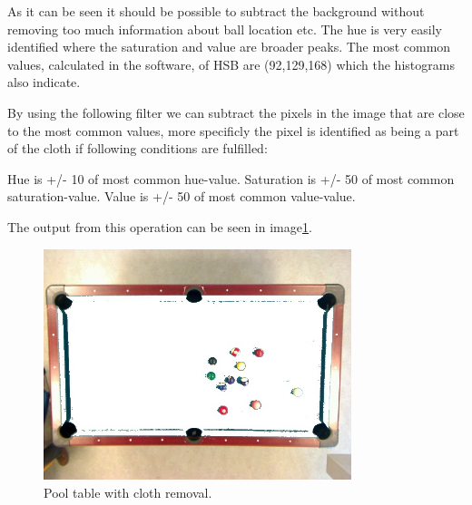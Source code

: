 As it can be seen it should be possible to subtract the background without removing too much information about ball location etc. The hue is very easily identified where the saturation and value are broader peaks.
The most common values, calculated in the software, of HSB are (92,129,168) which the histograms also indicate.

By using the following filter we can subtract the pixels in the image that are close to the most common values, more specificly the pixel is identified as being a part of the cloth if following conditions are fulfilled:

Hue is +/- 10 of most common hue-value.
Saturation is +/- 50 of most common saturation-value.
Value is +/- 50 of most common value-value.

The output from this operation can be seen in image\ref{fig:poolclothremoval}.

\begin{figure}[htb]
\begin{center}
\leavevmode
\includegraphics[width=0.8\textwidth]{images/table-remove-cloth.jpg}
\end{center}
\caption{Pool table with cloth removal.}
\label{fig:poolclothremoval}
\end{figure}



